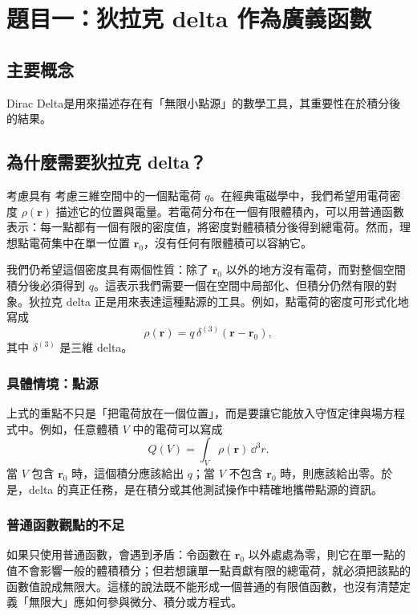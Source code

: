 \documentclass[10pt,a4paper,fontset=none]{ctexart}
\newcommand{\vect}[1]{\bm{#1}}
\begin{document}
\pagestyle{empty}

\section{題目一：狄拉克 delta 作為廣義函數}

\subsection{主要概念}
Dirac Delta是用來描述存在有「無限小點源」的數學工具，其重要性在於積分後的結果。
\subsection{為什麼需要狄拉克 delta？}
考慮具有
考慮三維空間中的一個點電荷 $q$。在經典電磁學中，我們希望用電荷密度 $\rho(\vect{r})$ 描述它的位置與電量。若電荷分布在一個有限體積內，可以用普通函數表示：每一點都有一個有限的密度值，將密度對體積積分後得到總電荷。然而，理想點電荷集中在單一位置 $\vect{r}_0$，沒有任何有限體積可以容納它。

我們仍希望這個密度具有兩個性質：除了 $\vect{r}_0$ 以外的地方沒有電荷，而對整個空間積分後必須得到 $q$。這表示我們需要一個在空間中局部化、但積分仍然有限的對象。狄拉克 delta 正是用來表達這種點源的工具。例如，點電荷的密度可形式化地寫成
\begin{equation}
  \rho(\vect{r}) = q\,\delta^{(3)}(\vect{r}-\vect{r}_0),
\end{equation}
其中 $\delta^{(3)}$ 是三維 delta。

\subsubsection{具體情境：點源}
上式的重點不只是「把電荷放在一個位置」，而是要讓它能放入守恆定律與場方程式中。例如，任意體積 $V$ 中的電荷可以寫成
\begin{equation}
  Q(V)=\int_V \rho(\vect{r})\,\dd^3 r.
\end{equation}
當 $V$ 包含 $\vect{r}_0$ 時，這個積分應該給出 $q$；當 $V$ 不包含 $\vect{r}_0$ 時，則應該給出零。於是，delta 的真正任務，是在積分或其他測試操作中精確地攜帶點源的資訊。

\subsubsection{普通函數觀點的不足}
如果只使用普通函數，會遇到矛盾：令函數在 $\vect{r}_0$ 以外處處為零，則它在單一點的值不會影響一般的體積積分；但若想讓單一點貢獻有限的總電荷，就必須把該點的函數值說成無限大。這樣的說法既不能形成一個普通的有限值函數，也沒有清楚定義「無限大」應如何參與微分、積分或方程式。
\end{document}
